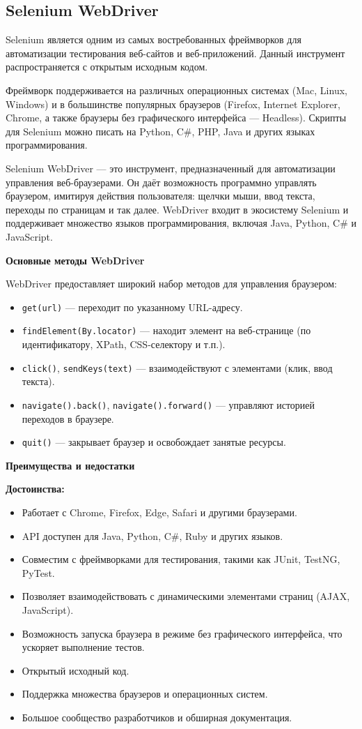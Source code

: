 \documentclass{article}[14pt]
\begin{document}
\subsection{Selenium WebDriver}

Selenium является одним из самых востребованных фреймворков для автоматизации тестирования веб-сайтов и веб-приложений. Данный инструмент распространяется с открытым исходным кодом.

Фреймворк поддерживается на различных операционных системах (Mac, Linux, Windows) и в большинстве популярных браузеров (Firefox, Internet Explorer, Chrome, а также браузеры без графического интерфейса — Headless). Скрипты для Selenium можно писать на Python, C\#, PHP, Java и других языках программирования.

Selenium WebDriver — это инструмент, предназначенный для автоматизации управления веб-браузерами. Он даёт возможность программно управлять браузером, имитируя действия пользователя: щелчки мыши, ввод текста, переходы по страницам и так далее. WebDriver входит в экосистему Selenium и поддерживает множество языков программирования, включая Java, Python, C\# и JavaScript.

\noindent \textbf{Основные методы WebDriver}

WebDriver предоставляет широкий набор методов для управления браузером:
\begin{itemize}
\item \texttt{get(url)} — переходит по указанному URL-адресу.
\item \texttt{findElement(By.locator)} — находит элемент на веб-странице (по идентификатору, XPath, CSS-селектору и т.п.).
\item \texttt{click()}, \texttt{sendKeys(text)} — взаимодействуют с элементами (клик, ввод текста).
\item \texttt{navigate().back()}, \texttt{navigate().forward()} — управляют историей переходов в браузере.
\item \texttt{quit()} — закрывает браузер и освобождает занятые ресурсы.
\end{itemize}

\noindent \textbf{Преимущества и недостатки}

\textbf{Достоинства:}
\begin{itemize}
\item Работает с Chrome, Firefox, Edge, Safari и другими браузерами.
\item API доступен для Java, Python, C\#, Ruby и других языков.
\item Совместим с фреймворками для тестирования, такими как JUnit, TestNG, PyTest.
\item Позволяет взаимодействовать с динамическими элементами страниц (AJAX, JavaScript).
\item Возможность запуска браузера в режиме без графического интерфейса, что ускоряет выполнение тестов.
\item Открытый исходный код.
\item Поддержка множества браузеров и операционных систем.
\item Большое сообщество разработчиков и обширная документация.
\end{itemize}
\end{document}
